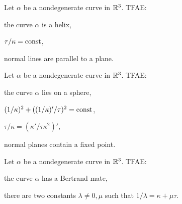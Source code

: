 \documentclass{../../large}
\def\a{\alpha}
\begin{document}
\begin{prb}[Helices]
Let $\a$ be a nondegenerate curve in $\mathbb{R}^3$.
TFAE:
\begin{parts}
\item the curve $\a$ is a helix,
\item $\tau/\kappa=\operatorname{const}$,
\item normal lines are parallel to a plane.
\end{parts}
\end{prb}

\begin{prb}
Let $\a$ be a nondegenerate curve in $\mathbb{R}^3$.
TFAE:
\begin{parts}
\item the curve $\a$ lies on a sphere,
\item $(1/\kappa)^2+((1/\kappa)'/\tau)^2=\operatorname{const}$,
\item $\tau/\kappa=(\kappa'/\tau\kappa^2)'$,
\item normal planes contain a fixed point.
\end{parts}
\end{prb}

\begin{prb}
Let $\a$ be a nondegenerate curve in $\mathbb{R}^3$.
TFAE:
\begin{parts}
\item the curve $\a$ has a Bertrand mate,
\item there are two constants $\lambda\ne0,\mu$ such that $1/\lambda=\kappa+\mu\tau$.
\end{parts}
\end{prb}

\end{document}
